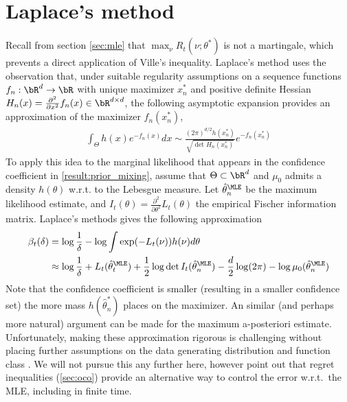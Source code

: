 \section{Laplace's method}\label{sec:laplace}
Recall from section \cref{sec:mle} that $\max_{\nu} R_t(\nu;\theta^*)$ is not a martingale, which prevents a direct application of Ville's inequality. Laplace's method uses the observation that, under suitable regularity assumptions on a sequence functions $f_n : \bR^d \rightarrow \bR$ with unique maximizer $x_n^*$ and positive definite Hessian $H_n(x) = \frac{\partial^2}{\partial x^2} f_n(x) \in \bR^{d \times d}$, the following asymptotic expansion provides an approximation of the maximizer $f_n(x_n^*)$, 
\begin{align*}
    \int_\Theta h(x) e^{- f_n(x)} dx \sim  \frac{(2\pi)^{d/2} h(x^*_n)}{\sqrt{\det H_n(x_n^*)}} e^{- f_n(x^*_n)}
\end{align*}
To apply this idea to the marginal likelihood that appears in the confidence coefficient in \cref{result:prior_mixing}, assume that $\Theta \subset \bR^d$ and $\mu_0$ admits a density $h(\theta)$ w.r.t. to the Lebesgue measure. Let $\hat \theta_n^\MLE$ be the maximum likelihood estimate, and $I_t(\theta) = \frac{\partial^2}{\partial \theta^2} L_t(\theta)$ the empirical Fischer information matrix. Laplace's methods gives the following approximation
\begin{align*}
\beta_t(\delta) &= \log \frac{1}{\delta} - \log \int \exp(-L_t(\nu))  h(\nu) d\theta\\
&\approx\log \frac{1}{\delta} + L_t(\hat \theta_t^{\MLE})  + \frac{1}{2}\log \det I_t(\hat \theta_n^\MLE) - \frac{d}{2} \log(2\pi) - \log \mu_0(\hat \theta_n^\MLE)  
\end{align*}
Note that the confidence coefficient is smaller (resulting in a smaller confidence set) the more mass $h(\hat \theta^*_n)$ places on the maximizer.
An similar (and perhaps more natural) argument can be made for the maximum a-posteriori estimate.
Unfortunately, making these approximation rigorous is challenging without placing further assumptions on the data generating distribution and function class \citep[e.g.,][]{shun1995laplace}. We will not pursue this any further here, however point out that regret inequalities (\cref{sec:oco}) provide an alternative way to control the error w.r.t.~the MLE, including in finite time.